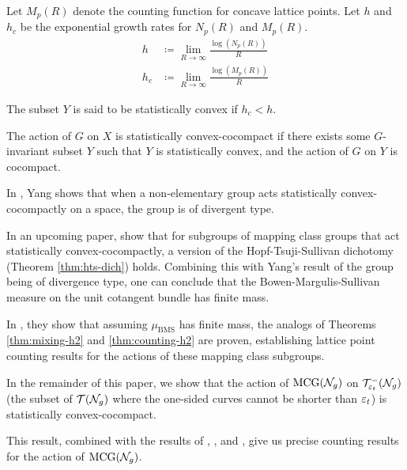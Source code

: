 Let $M_p(R)$ denote the counting function for concave lattice points.
Let $h$ and $h_c$ be the exponential growth rates for $N_p(R)$ and $M_p(R)$.
\begin{align*}
  h &\coloneqq \lim_{R \to \infty} \frac{\log\left( N_p(R) \right)}{R} \\
  h_c &\coloneqq \lim_{R \to \infty} \frac{\log\left( M_p(R) \right)}{R}
\end{align*}

\begin{definition}
  \label{defn:statistical-convex-subset}
  The subset $Y$ is said to be statistically convex if $h_c < h$.
\end{definition}

\begin{definition}
  The action of $G$ on $X$ is statistically convex-cocompact if there exists some $G$-invariant subset $Y$ such that $Y$ is statistically convex, and the action of $G$ on $Y$ is cocompact.
\end{definition}

In \cite{10.1093/imrn/rny001}, Yang shows that when a non-elementary group acts statistically convex-cocompactly on a space, the group is of divergent type.

In an upcoming paper, \textcite{CGTY} show that for subgroups of mapping class groups that act statistically convex-cocompactly, a version of the Hopf-Tsuji-Sullivan dichotomy (Theorem \ref{thm:hts-dich}) holds.
Combining this with Yang's result of the group being of divergence type, one can conclude that the Bowen-Margulis-Sullivan measure on the unit cotangent bundle has finite mass.

In \textcite{gekhtman2023dynamics}, they show that assuming $\mu_{\mathrm{BMS}}$ has finite mass, the analogs of Theorems \ref{thm:mixing-h2} and \ref{thm:counting-h2} are proven, establishing lattice point counting results for the actions of these mapping class subgroups.

In the remainder of this paper, we show that the action of $\mathrm{MCG}(\mathcal{N}_g)$ on $\mathcal{T}_{\varepsilon_t}^{-}(\mathcal{N}_g)$ (the subset of $\mathcal{T}(\mathcal{N}_g)$ where the one-sided curves cannot be shorter than $\varepsilon_t$) is statistically convex-cocompact.

This result, combined with the results of \textcite{10.1093/imrn/rny001}, \textcite{CGTY}, and \textcite{gekhtman2023dynamics}, give us precise counting results for the action of $\mathrm{MCG}(\mathcal{N}_g)$.


